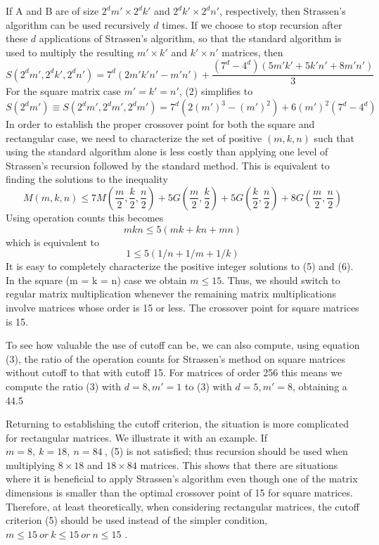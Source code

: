 \documentclass[UTF8]{ctexart}
\begin{document}
If A and B are of size $2^d m'\times 2^d k'$ and $2^d k'\times 2^d n'$, respectively,  then Strassen's algorithm can be used recursively $d$ times. If we choose to stop recursion after these $d$ applications of Strassen's algorithm, so that the standard algorithm is used to multiply the resulting $m' \times k'$ and $k' \times n'$ matrices, then
\begin{equation}
  S(2^dm',2^dk',2^dn')=7^d(2m'k'n'-m'n')+\frac{(7^d-4^d)(5m'k'+5k'n'+8m'n')}{3}
\end{equation}
For the square matrix case $m'=k'=n'$, (2) simplifies to
\begin{equation}
  S(2^dm')\equiv S(2^dm',2^dm',2^dm')=7^d(2(m')^3-(m')^2)+6(m')^2(7^d-4^d)
\end{equation}
In order to establish the proper crossover point for both the square and rectangular case, we need to characterize the set of positive $(m,k,n)$ such that using the standard algorithm alone is less costly than applying one level of Strassen's recursion followed by the standard method. This is equivalent to finding the solutions to the inequality
\begin{equation}
  M(m,k,n)\leq 7M(\frac{m}{2},\frac{k}{2},\frac{n}{2})+5G(\frac{m}{2},\frac{k}{2})+5G(\frac{k}{2},\frac{n}{2})+8G(\frac{m}{2},\frac{n}{2})
\end{equation}
Using operation counts this becomes
\begin{equation}
  mkn\leq 5(mk+kn+mn)
\end{equation}
which is equivalent to
\begin{equation}
  1 \leq 5(1/n+1/m+1/k)
\end{equation}
It is easy to completely characterize the positive integer solutions to (5) and (6). In the square (m = k = n) case we obtain $m\leq 15$. Thus, we should switch to regular matrix multiplication whenever the remaining matrix multiplications involve matrices whose order is 15 or less. The crossover point for square matrices is 15.

To see how valuable the use of cutoff can be, we can also compute, using equation (3), the ratio of the operation counts for Strassen's method on square matrices without cutoff to that with cutoff 15. For matrices of order 256 this means we compute the ratio (3) with $d=8, m'=1$ to (3) with $d=5, m'=8$, obtaining a 44.5%

Returning to establishing the cutoff criterion, the situation is more complicated for rectangular matrices. We illustrate it with an example. If $m=8,\ k=18,\ n=84\ $,  (5) is not satisfied; thus recursion should be used when multiplying $8 \times 18$ and $18 \times 84$ matrices. This shows that there are situations where it is beneficial to apply Strassen's algorithm even though one of the matrix dimensions is smaller than the optimal crossover point of 15 for square matrices. Therefore, at least theoretically, when considering rectangular matrices, the cutoff criterion (5) should be used instead of the simpler condition, $m\leq 15\ or\ k\leq 15\ or\ n\leq 15$ .
\end{document}
